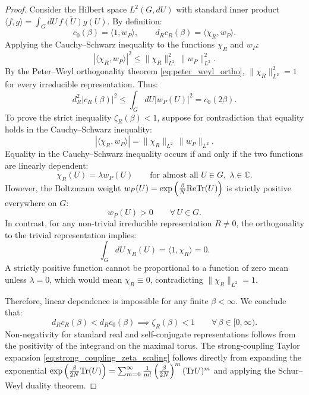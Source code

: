 \begin{proof}
Consider the Hilbert space $L^2(G, dU)$ with standard inner product $\langle f, g \rangle = \int_G dU \, \overline{f(U)} g(U)$.
By definition:
\begin{equation}
c_0(\beta) = \langle 1, w_P \rangle, \qquad d_R c_R(\beta) = \langle \chi_R, w_P \rangle.
\end{equation}
Applying the Cauchy--Schwarz inequality to the functions $\chi_R$ and $w_P$:
\begin{equation}
\label{eq:cs_character_bound}
\left| \langle \chi_R, w_P \rangle \right|^2 \le \|\chi_R\|_{L^2}^2 \, \|w_P\|_{L^2}^2.
\end{equation}
By the Peter--Weyl orthogonality theorem \eqref{eq:peter_weyl_ortho}, $\|\chi_R\|_{L^2}^2 = 1$ for every irreducible representation. Thus:
\begin{equation}
d_R^2 |c_R(\beta)|^2 \le \int_G dU |w_P(U)|^2 = c_0(2\beta).
\end{equation}
To prove the strict inequality $\zeta_R(\beta) < 1$, suppose for contradiction that equality holds in the Cauchy--Schwarz inequality:
\begin{equation}
|\langle \chi_R, w_P \rangle| = \|\chi_R\|_{L^2} \, \|w_P\|_{L^2}.
\end{equation}
Equality in the Cauchy--Schwarz inequality occurs if and only if the two functions are linearly dependent:
\begin{equation}
\chi_R(U) = \lambda w_P(U) \qquad \text{for almost all } U \in G, \; \lambda \in \mathbb{C}.
\end{equation}
However, the Boltzmann weight $w_P(U) = \exp\left( \frac{\beta}{N} \mathrm{Re} \mathrm{Tr}(U) \right)$ is strictly positive everywhere on $G$:
\begin{equation}
w_P(U) > 0 \qquad \forall \, U \in G.
\end{equation}
In contrast, for any non-trivial irreducible representation $R \neq 0$, the orthogonality to the trivial representation implies:
\begin{equation}
\int_G dU \, \chi_R(U) = \langle 1, \chi_R \rangle = 0.
\end{equation}
A strictly positive function cannot be proportional to a function of zero mean unless $\lambda = 0$, which would mean $\chi_R \equiv 0$, contradicting $\|\chi_R\|_{L^2} = 1$. 

Therefore, linear dependence is impossible for any finite $\beta < \infty$. We conclude that:
\begin{equation}
d_R c_R(\beta) < d_R c_0(\beta) \implies \zeta_R(\beta) < 1 \qquad \forall \, \beta \in [0, \infty).
\end{equation}
Non-negativity for standard real and self-conjugate representations follows from the positivity of the integrand on the maximal torus. The strong-coupling Taylor expansion \eqref{eq:strong_coupling_zeta_scaling} follows directly from expanding the exponential $\exp\left( \frac{\beta}{2N} \mathrm{Tr}(U) \right) = \sum_{m=0}^\infty \frac{1}{m!} \left( \frac{\beta}{2N} \right)^m (\mathrm{Tr} U)^m$ and applying the Schur--Weyl duality theorem.
\end{proof}

